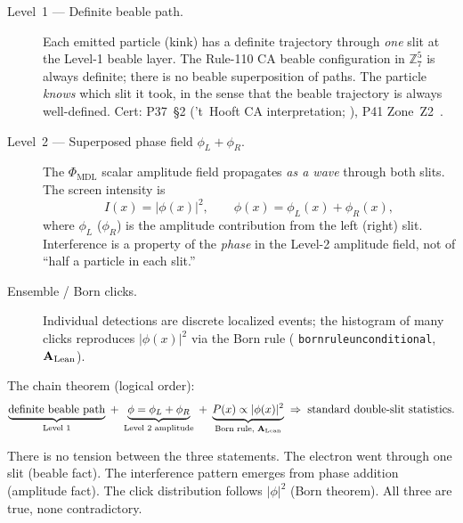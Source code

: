 \documentclass[11pt,openany]{book}
\theoremstyle{remark}
\newcommand{\MDL}{\text{MDL}}
\newcommand{\lean}[1]{%
  \penalty-100
  \begingroup\def\_{\textunderscore\allowbreak}\texttt{#1}\endgroup}
\newcommand{\CatAL}{\ensuremath{\textbf{A}_{\rm Lean}}}
\begin{document}
\begin{description}

\item[Level~1 --- Definite beable path.]
  Each emitted particle (kink) has a definite trajectory through \emph{one} slit at the
  Level-1 beable layer.  The Rule-110 CA beable configuration in $\mathbb{Z}_7^5$ is always
  definite; there is no beable superposition of paths.  The particle \emph{knows} which
  slit it took, in the sense that the beable trajectory is always well-defined.
  Cert: P37~§2 ('t~Hooft CA interpretation; \cite{SpivackQMFromR110}),
  P41 Zone~Z2~\cite{SpivackCMCA}.

\item[Level~2 --- Superposed phase field $\phi_L + \phi_R$.]
  The $\Phi_{\MDL}$ scalar amplitude field propagates \emph{as a wave} through both slits.
  The screen intensity is
  \[
    I(x) = |\phi(x)|^2,
    \qquad \phi(x) = \phi_L(x) + \phi_R(x),
  \]
  where $\phi_L$ ($\phi_R$) is the amplitude contribution from the left (right) slit.
  Interference is a property of the \emph{phase} in the Level-2 amplitude field, not of
  ``half a particle in each slit.''

\item[Ensemble / Born clicks.]
  Individual detections are discrete localized events; the histogram of many clicks
  reproduces $|\phi(x)|^2$ via the Born rule (\lean{born\_rule\_unconditional}, \CatAL).

\end{description}

The chain theorem (logical order):
\[
  \underbrace{\text{definite beable path}}_{\text{Level 1}}
  \;+\;
  \underbrace{\phi = \phi_L + \phi_R}_{\text{Level 2 amplitude}}
  \;+\;
  \underbrace{P(x) \propto |\phi(x)|^2}_{\text{Born rule, \CatAL}}
  \;\Rightarrow\;
  \text{standard double-slit statistics.}
\]

There is no tension between the three statements.  The electron went through one slit
(beable fact).  The interference pattern emerges from phase addition (amplitude fact).
The click distribution follows $|\phi|^2$ (Born theorem).  All three are true, none
contradictory.
\end{document}
